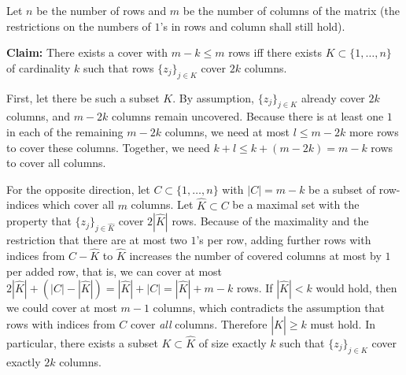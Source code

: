\documentclass[10pt,a4paper]{scrartcl}
\newcommand{\subExercise}[1]{\vspace{0.5em} \noindent{\bf #1)}}
\begin{document}
\subExercise{b} Let $n$ be the number of rows and $m$ be the number of columns of the matrix (the restrictions on the numbers of $1$'s in rows and column shall still hold).

{\textbf{Claim:}} There exists a cover with $m - k \leq m$ rows iff there exists 
$K\subset\{1,\dots,n\}$ of cardinality $k$ such that rows $\{z_j\}_{j\in K}$ cover $2 k$ columns.

 First, let there be such a subset $K$. By assumption, $\{z_j\}_{j\in K}$ 
already cover $2 k$ columns, and $m - 2 k$ columns remain uncovered. Because there is at least one $1$ in each of the remaining $m - 2 k$ columns, we need at most $l \leq m - 2 k$ more rows to cover these columns. Together, we need $k + l \leq k + (m - 2 k) = m - k$ rows to cover all columns.

For the opposite direction, let $C \subset \{1,\dots,n\}$ with $|C| = m - k$ be a subset of row-indices which cover all $m$ columns. 
Let $\hat K \subset C$ be a maximal set with the property that $\{z_j\}_{j\in \hat K}$ cover $2 |\hat K|$ rows. 
Because of the maximality and the restriction that there are at most two $1$'s per row, adding further rows with indices from $C - \hat K$ to $\hat K$ increases the number of covered columns at most by $1$ per added row, that is, 
we can cover at most $2 |\hat K| + (|C| - |\hat K|) = |\hat K| + |C| = |\hat K| + m - k$ rows. 
If $|\hat K| < k$ would hold, then we could cover at most $m - 1$ columns, which contradicts the assumption that rows with indices from $C$ cover \emph{all} columns. Therefore $|\hat K| \geq k$ must hold. In particular, there exists a subset $K \subset \hat K$ of size exactly $k$ such that $\{z_j\}_{j\in K}$ cover exactly $2 k$ columns.
\end{document}
